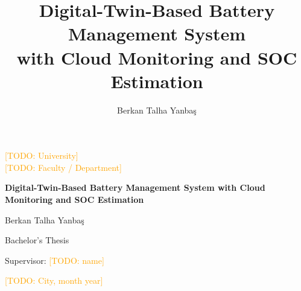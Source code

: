 \documentclass[11pt,a4paper,oneside]{report}
\title{Digital-Twin-Based Battery Management System\\with Cloud Monitoring and SOC Estimation}
\author{Berkan Talha Yanbaş}
\date{\todo{month year}}
\newcommand{\todo}[1]{\textcolor{orange}{[TODO: #1]}}
\begin{document}
\begin{titlepage}
  \centering
  {\large \todo{University}\\ \todo{Faculty / Department}\par}
  \vspace{3cm}
  {\LARGE\bfseries Digital-Twin-Based Battery Management System with Cloud Monitoring and SOC Estimation\par}
  \vspace{2cm}
  {\large Berkan Talha Yanbaş\par}
  \vspace{1cm}
  {\large Bachelor's Thesis\par}
  \vfill
  {\large Supervisor: \todo{name}\par}
  \vspace{1cm}
  {\large \todo{City, month year}\par}
\end{titlepage}


\tableofcontents
\listoffigures
\cleardoublepage
{}










\end{document}
